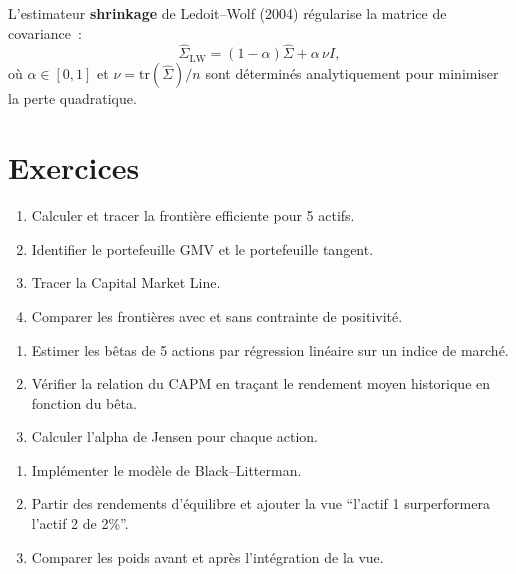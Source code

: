 \begin{proposition}
L'estimateur \textbf{shrinkage} de Ledoit--Wolf (2004) r\'egularise la
matrice de covariance~:
\[
    \hat{\Sigma}_{\text{LW}} = (1-\alpha)\hat{\Sigma} + \alpha\,\nu I,
\]
o\`u $\alpha \in [0,1]$ et $\nu = \text{tr}(\hat{\Sigma})/n$ sont
d\'etermin\'es analytiquement pour minimiser la perte quadratique.
\end{proposition}

\section{Exercices}

\begin{exercice}
\begin{enumerate}
    \item Calculer et tracer la fronti\`ere efficiente pour 5 actifs.
    \item Identifier le portefeuille GMV et le portefeuille tangent.
    \item Tracer la Capital Market Line.
    \item Comparer les fronti\`eres avec et sans contrainte de positivit\'e.
\end{enumerate}
\end{exercice}

\begin{exercice}
\begin{enumerate}
    \item Estimer les b\^etas de 5 actions par r\'egression lin\'eaire sur
          un indice de march\'e.
    \item V\'erifier la relation du CAPM en tra\c{c}ant le rendement moyen
          historique en fonction du b\^eta.
    \item Calculer l'alpha de Jensen pour chaque action.
\end{enumerate}
\end{exercice}

\begin{exercice}
\begin{enumerate}
    \item Impl\'ementer le mod\`ele de Black--Litterman.
    \item Partir des rendements d'\'equilibre et ajouter la vue ``l'actif 1
          surperformera l'actif 2 de 2\%''.
    \item Comparer les poids avant et apr\`es l'int\'egration de la vue.
\end{enumerate}
\end{exercice}

